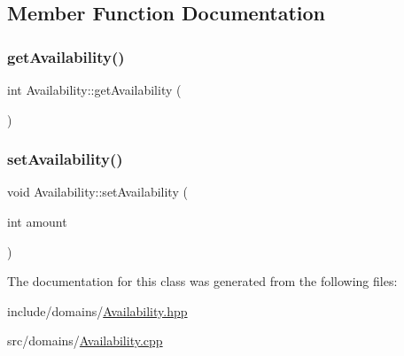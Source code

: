\subsection{Member Function Documentation}
\mbox{\label{class_availability_a9775ae24b35cbe45a9b23b442f9112cd}} 
\subsubsection{\texorpdfstring{getAvailability()}{getAvailability()}}
{\footnotesize\ttfamily int Availability\+::get\+Availability (\begin{DoxyParamCaption}{ }\end{DoxyParamCaption})}

\mbox{\label{class_availability_a315634988dad6624afc1330bc77e08ae}} 
\subsubsection{\texorpdfstring{setAvailability()}{setAvailability()}}
{\footnotesize\ttfamily void Availability\+::set\+Availability (\begin{DoxyParamCaption}\item[{int}]{amount }\end{DoxyParamCaption})}



The documentation for this class was generated from the following files\+:\begin{DoxyCompactItemize}
\item 
include/domains/\mbox{\hyperlink{_availability_8hpp}{Availability.\+hpp}}\item 
src/domains/\mbox{\hyperlink{_availability_8cpp}{Availability.\+cpp}}\end{DoxyCompactItemize}
